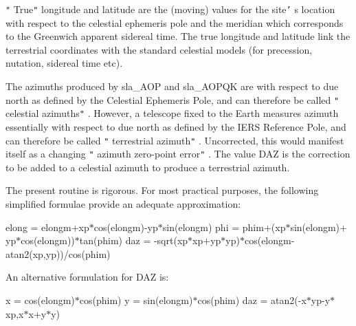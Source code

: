 \documentclass[twoside,11pt,nolof]{starlink}
\begin{document}
{{{         \sstitem
          \texttt{"} True\texttt{"}  longitude and latitude are the (moving) values for
           the site\texttt{'} s location with respect to the celestial ephemeris
           pole and the meridian which corresponds to the Greenwich
           apparent sidereal time.  The true longitude and latitude
           link the terrestrial coordinates with the standard celestial
           models (for precession, nutation, sidereal time etc).

         \sstitem
          The azimuths produced by sla\_AOP and sla\_AOPQK are with
           respect to due north as defined by the Celestial Ephemeris
           Pole, and can therefore be called \texttt{"} celestial azimuths\texttt{"} .
           However, a telescope fixed to the Earth measures azimuth
           essentially with respect to due north as defined by the
           IERS Reference Pole, and can therefore be called \texttt{"} terrestrial
           azimuth\texttt{"} .  Uncorrected, this would manifest itself as a
           changing \texttt{"} azimuth zero-point error\texttt{"} .  The value DAZ is the
           correction to be added to a celestial azimuth to produce
           a terrestrial azimuth.

         \sstitem
          The present routine is rigorous.  For most practical
           purposes, the following simplified formulae provide an
           adequate approximation:

      }
        elong = elongm$+$xp$*$cos(elongm)-yp$*$sin(elongm)
        phi   = phim$+$(xp$*$sin(elongm)$+$yp$*$cos(elongm))$*$tan(phim)
        daz   = -sqrt(xp$*$xp$+$yp$*$yp)$*$cos(elongm-atan2(xp,yp))/cos(phim)

        An alternative formulation for DAZ is:

        x = cos(elongm)$*$cos(phim)
        y = sin(elongm)$*$cos(phim)
        daz = atan2(-x$*$yp-y$*$xp,x$*$x$+$y$*$y)

   }
}
\end{document}
